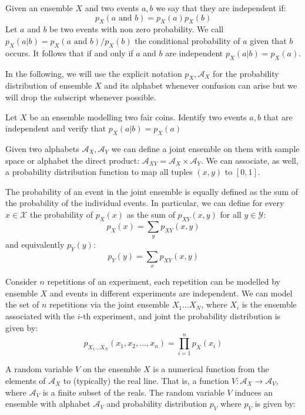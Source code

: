 Given an ensemble $X$ and two events $a,b$ we say that they are independent if:
\begin{equation}
p_{X}(a \text{ and } b)=p_{X}(a)p_{X}(b)
\end{equation}
Let $a$ and $b$ be two events with non zero probability. We call $p_{X}(a|b)=p_{X}(a \text{ and } b)/p_{X}(b)$ the conditional probability of $a$ given that $b$ occurs. It follows that if and only if $a$ and $b$ are independent $p_{X}(a|b)=p_{X}(a)$.

In the following, we will use the explicit notation $p_{X},\mathcal A_{X}$ for the probability distribution of ensemble $X$ and its alphabet whenever confusion can arise but we will drop the subscript whenever possible.
\begin{exercise}
\label{ex:ensemble}
Let $X$ be an ensemble modelling two fair coins. Identify two events $a,b$ that are independent and verify that $p_{X}(a|b)=p_{X}(a)$
\end{exercise}
Given two alphabets $\mathcal A_{X},\mathcal A_Y$ we can define a joint ensemble on them with sample space or alphabet the direct product: $\mathcal A_{XY} = \mathcal A_X \times \mathcal A_Y$. 
We can associate, as well, a probability distribution function to map all tuples $(x,y)$ to $[0,1]$. 

The probability of an event in the joint ensemble is equally defined as the sum of the probability of the individual events. 
In particular, we can define for every $x\in\mathcal X$ the probability of $p_X(x)$ as the sum of $p_{XY}(x,y)$ for all $y\in\mathcal Y$:
\begin{equation}
p_X(x)=\sum_{y}p_{XY}(x,y)
\end{equation} 
\noindent and equivalently $p_Y(y)$:
\begin{equation}
p_Y(y)=\sum_{x}p_{XY}(x,y)
\end{equation} 
\begin{example}
Consider $n$ repetitions of an experiment, each repetition can be modelled by ensemble $X$ and events in different experiments are independent. We can model the set of $n$ repetitions via the joint ensemble $X_1\ldots X_N$, where $X_i$ is the ensemble associated with the $i$-th experiment, and joint the probability distribution is given by:
\begin{equation}
p_{X_1\ldots X_N}(x_1,x_2,\ldots,x_n)=\prod_{i=1}^np_X(x_i)
\end{equation}
\end{example}
A random variable $V$ on the ensemble $X$ is a numerical function from the elements of $\mathcal A_X$ to (typically) the real line. That is, a function $V:\mathcal{A}_X\rightarrow \mathcal A_V$, where $\mathcal A_V$ is a finite subset of the reals. The random variable $V$ induces an ensemble with alphabet $\mathcal A_V$ and probability distribution $p_V$ where $p_V$ is given by:

